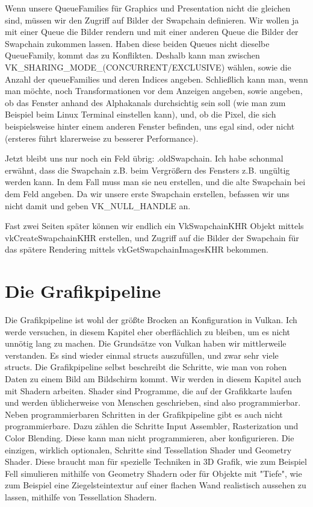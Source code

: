 \documentclass[11pt,a4paper]{report}
\begin{document}
Wenn unsere QueueFamilies für Graphics und Presentation nicht die gleichen sind, müssen wir den Zugriff auf Bilder der Swapchain definieren. Wir wollen ja mit einer Queue die Bilder rendern und mit einer anderen Queue die Bilder der Swapchain zukommen lassen. Haben diese beiden Queues nicht dieselbe QueueFamily, kommt das zu Konflikten. Deshalb kann man zwischen VK\_SHARING\_MODE\_(CONCURRENT/EXCLUSIVE) wählen, sowie die Anzahl der queueFamilies und deren Indices angeben. Schließlich kann man, wenn man möchte, noch Transformationen vor dem Anzeigen angeben, sowie angeben, ob das Fenster anhand des Alphakanals durchsichtig sein soll (wie man zum Beispiel beim Linux Terminal einstellen kann), und, ob die Pixel, die sich beispielsweise hinter einem anderen Fenster befinden, uns egal sind, oder nicht (ersteres führt klarerweise zu besserer Performance).

Jetzt bleibt uns nur noch ein Feld übrig: .oldSwapchain. Ich habe schonmal erwähnt, dass die Swapchain z.B. beim Vergrößern des Fensters z.B. ungültig werden kann. In dem Fall muss man sie neu erstellen, und die alte Swapchain bei dem Feld angeben. Da wir unsere erste Swapchain erstellen, befassen wir uns nicht damit und geben VK\_NULL\_HANDLE an.

Fast zwei Seiten später können wir endlich ein VkSwapchainKHR Objekt mittels vkCreateSwapchainKHR erstellen, und Zugriff auf die Bilder der Swapchain für das spätere Rendering mittels vkGetSwapchainImagesKHR bekommen.

\chapter{Die Grafikpipeline}
Die Grafikpipeline ist wohl der größte Brocken an Konfiguration in Vulkan. Ich werde versuchen, in diesem Kapitel eher oberflächlich zu bleiben, um es nicht unnötig lang zu machen. Die Grundsätze von Vulkan haben wir mittlerweile verstanden. Es sind wieder einmal structs auszufüllen, und zwar sehr viele structs. Die Grafikpipeline selbst beschreibt die Schritte, wie man von rohen Daten zu einem Bild am Bildschirm kommt. Wir werden in diesem Kapitel auch mit Shadern arbeiten. Shader sind Programme, die auf der Grafikkarte laufen und werden üblicherweise von Menschen geschrieben, sind also programmierbar. Neben programmierbaren Schritten in der Grafikpipeline gibt es auch nicht programmierbare. Dazu zählen die Schritte Input Assembler, Rasterization und Color Blending. Diese kann man nicht programmieren, aber konfigurieren. Die einzigen, wirklich optionalen, Schritte sind Tessellation Shader und Geometry Shader. Diese braucht man für spezielle Techniken in 3D Grafik, wie zum Beispiel Fell simulieren mithilfe von Geometry Shadern oder für Objekte mit "Tiefe", wie zum Beispiel eine Ziegelsteintextur auf einer flachen Wand realistisch aussehen zu lassen, mithilfe von Tessellation Shadern.
\end{document}
